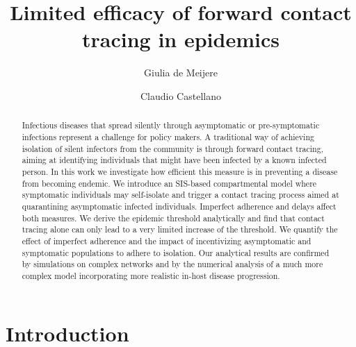 \documentclass[aps,twocolumn,superscriptaddress,nofootinbib,pre,floatfix]{revtex4-1}
\begin{document}
\title{Limited efficacy of forward contact tracing in epidemics}

\author{Giulia de Meijere}

\author{Claudio Castellano}

\begin{abstract}
  Infectious diseases that spread silently through asymptomatic or
  pre-symptomatic infections represent a challenge for policy makers.
  A traditional way of
  achieving isolation of silent infectors from the community is
  through forward contact tracing, aiming at identifying individuals
  that might have been infected by a known infected person.
  In this work we investigate how efficient this measure is
  in preventing a disease from becoming endemic.
  We introduce an SIS-based compartmental model where 
  symptomatic individuals may self-isolate and trigger a contact tracing
  process aimed at quarantining asymptomatic infected individuals.
  Imperfect adherence and delays affect both measures.
  We derive the epidemic threshold analytically and find
  that contact tracing alone can only lead to a very limited increase
  of the threshold.
  We quantify the effect of imperfect adherence and the impact of
  incentivizing asymptomatic and
  symptomatic populations to adhere to isolation. Our
  analytical results are confirmed by simulations on complex networks
  and by the numerical analysis of a much more complex model
  incorporating more realistic in-host disease progression.
\end{abstract}

\maketitle

\section*{Introduction}
\end{document}
